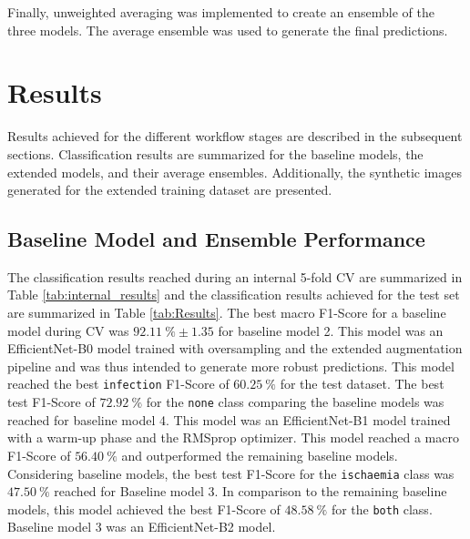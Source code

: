 \documentclass[runningheads]{llncs}
\begin{document}
Finally, unweighted averaging was implemented to create an ensemble of the three models. The average ensemble was used to generate the final predictions.



\section{Results}
\label{sec:results}

Results achieved for the different workflow stages are described in the subsequent sections. Classification results are summarized for the baseline models, the extended models, and their average ensembles. Additionally, the synthetic images generated for the extended training dataset are presented.



\subsection{Baseline Model and Ensemble Performance} %

The classification results reached during an internal 5-fold CV are summarized in Table \ref{tab:internal_results} and the classification results achieved for the test set are summarized in Table \ref{tab:Results}. The best macro F1-Score for a baseline model during CV was $92.11~\%\pm1.35$ for baseline model 2. This model was an EfficientNet-B0 model trained with oversampling and the extended augmentation pipeline and was thus intended to generate more robust predictions. This model reached the best \texttt{infection} F1-Score of $60.25~\%$ for the test dataset. The best test F1-Score of $72.92~\%$ for the \texttt{none} class comparing the baseline models was reached for baseline model 4. This model was an EfficientNet-B1 model trained with a warm-up phase and the RMSprop \cite{Hinton2012RMSprop} optimizer. This model reached a macro F1-Score of $56.40~\%$ and outperformed the remaining baseline models. Considering baseline models, the best test F1-Score for the \texttt{ischaemia} class was $47.50~\%$ reached for Baseline model 3. In comparison to the remaining baseline models, this model achieved the best F1-Score of $48.58~\%$ for the \texttt{both} class. Baseline model 3 was an EfficientNet-B2 model.
\end{document}
